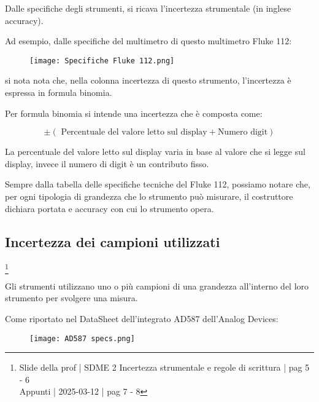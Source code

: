 Dalle specifiche degli strumenti, 
si ricava l'incertezza strumentale (in inglese accuracy). \newline 

Ad esempio, dalle specifiche del multimetro di questo multimetro Fluke 112: 

\begin{figure}[h]
    \centering
    \texttt{[image: Specifiche Fluke 112.png]}
\end{figure}

si nota nota che, nella colonna incertezza di questo strumento, l'incertezza è espressa in formula binomia. \newline 

Per formula binomia si intende una incertezza che è composta come: 

{
    \Large 
    \begin{equation}
        \pm (\text{ Percentuale del valore letto sul display} + \text{Numero digit})
    \end{equation}
}

La percentuale del valore letto sul display varia in base al valore che si legge sul display, 
invece il numero di digit è un contributo fisso. \newline 

Sempre dalla tabella delle specifiche tecniche del Fluke 112, possiamo notare che, 
per ogni tipologia di grandezza che lo strumento può misurare, il costruttore dichiara portata e accuracy con cui lo strumento opera. \newline 

\newpage 

\subsection{Incertezza dei campioni utilizzati}
\footnote{Slide della prof | SDME 2 Incertezza strumentale e regole di scrittura | pag 5 - 6 \\  
Appunti | 2025-03-12 | pag 7 - 8}

Gli strumenti utilizzano uno o più campioni di una grandezza all'interno del loro strumento per svolgere una misura. \newline 

Come riportato nel DataSheet dell'integrato AD587 dell'Analog Devices: 

\begin{figure}[h]
    \centering
    \texttt{[image: AD587 specs.png]}
\end{figure}

